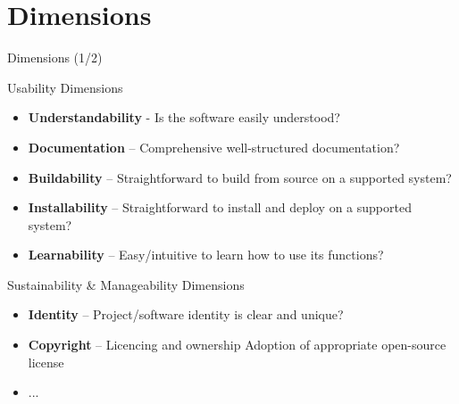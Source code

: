 \documentclass[compress]{beamer}
\begin{document}
\section{Dimensions}

\begin{frame}{Dimensions (1/2)}
    \begin{block}{Usability Dimensions}
        \begin{itemize}    
            \item \textbf{Understandability} - Is the software easily understood? 
            \item \textbf{Documentation} -- Comprehensive well-structured documentation?
            \item \textbf{Buildability}  -- Straightforward to build from source on a supported system?
            \item \textbf{Installability} -- Straightforward to install and deploy on a supported system?
            \item \textbf{Learnability} -- Easy/intuitive to learn how to use its functions?
        \end{itemize}
    \end{block}
    \begin{block}{Sustainability \& Manageability Dimensions}
        \begin{itemize}    
            \item \textbf{Identity} -- Project/software identity is clear and unique? 
            \item \textbf{Copyright} -- Licencing and ownership Adoption of appropriate open-source license
            \item ...
        \end{itemize}
    \end{block}
\end{frame}
\end{document}
